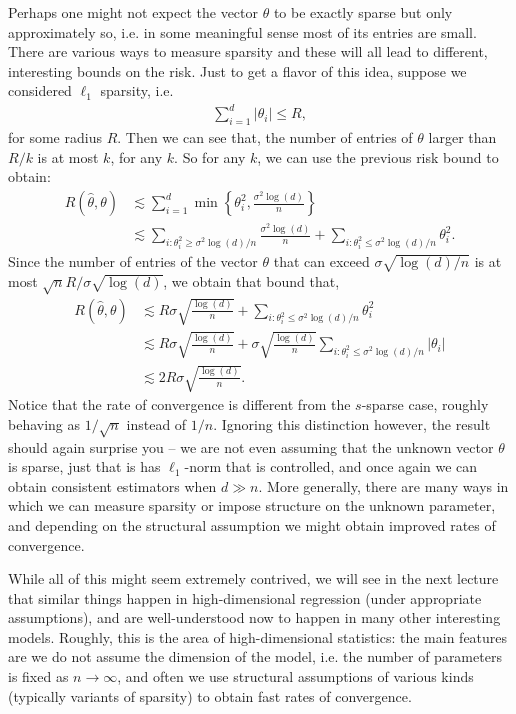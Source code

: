 \documentclass[twoside,12pt]{article}
\begin{document}
Perhaps one might not expect the vector $\theta$ to be exactly sparse but only approximately so, i.e. in some meaningful sense most of its entries are small. There are various ways to measure sparsity and these will all lead to different, interesting bounds on the risk. Just to get a flavor of this idea, suppose we considered $\ell_1$ sparsity, i.e. 
\begin{align*}
\sum_{i=1}^d |\theta_i| \leq R,
\end{align*}
for some radius $R$. Then we can see that, the number of entries of $\theta$ larger than $R/k$ is at most $k$, for any $k$. 
So for any $k$, we can use the previous risk bound to obtain:
\begin{align*}
R(\widehat{\theta},\theta) &\lesssim \sum_{i=1}^d \min\left\{\theta_i^2, \frac{\sigma^2 \log(d)}{n} \right\} \\
&\lesssim  \sum_{i: \theta_i^2 \geq \sigma^2 \log(d)/n} \frac{\sigma^2 \log(d)}{n} + \sum_{i: \theta_i^2 \leq \sigma^2 \log(d)/n} \theta_i^2.
\end{align*}
Since the number of entries of the vector $\theta$ that can exceed $\sigma \sqrt{\log(d)/n}$ is at most $\sqrt{n}R/\sigma \sqrt{\log(d)}$, we obtain that bound that,
\begin{align*}
R(\widehat{\theta},\theta) &\lesssim  R \sigma  \sqrt{ \frac{\log(d)}{n}}+ \sum_{i: \theta_i^2 \leq \sigma^2 \log(d)/n} \theta_i^2 \\
&\lesssim   R \sigma \sqrt{ \frac{\log(d)}{n}} +  \sigma \sqrt{\frac{\log(d)}{n}}\sum_{i: \theta_i^2 \leq \sigma^2 \log(d)/n} |\theta_i| \\
&\lesssim  2R \sigma  \sqrt{ \frac{\log(d)}{n}}.
\end{align*}
Notice that the rate of convergence is different from the $s$-sparse case, roughly behaving as $1/\sqrt{n}$ instead of $1/n$. Ignoring this distinction however, the 
result should again surprise you -- we are not even assuming that the unknown vector $\theta$ is sparse, just that is has $\ell_1$-norm that is controlled, and once again we can obtain consistent estimators when $d \gg n$.  More generally, there are many ways in which we can measure sparsity or impose structure on the unknown parameter, and depending on the structural assumption we might obtain improved rates of convergence.

While all of this might seem extremely contrived, we will see in the next lecture that similar things happen in high-dimensional regression (under appropriate assumptions), and are well-understood now to happen in many other interesting models. Roughly, this is the area of high-dimensional statistics: the main features are we do not assume the dimension of the model, i.e. the number of parameters is fixed as $n \rightarrow \infty$, and often we use structural assumptions of various kinds (typically variants of sparsity) to obtain fast rates of convergence.
\end{document}
